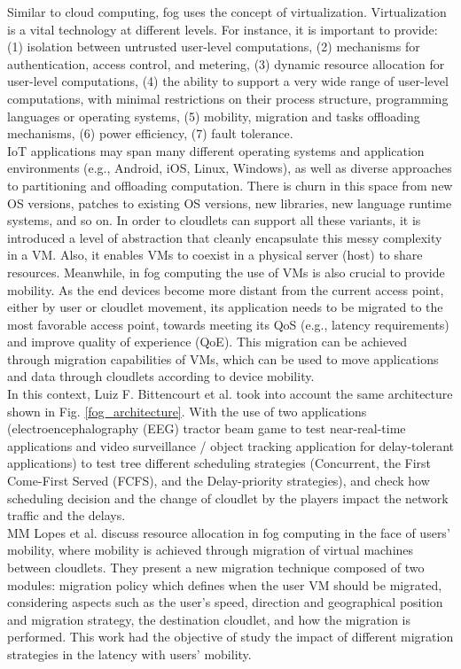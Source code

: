 Similar to cloud computing, fog uses the concept of virtualization. Virtualization is a vital technology at different levels. For instance, it is important to provide: (1) isolation between untrusted user-level computations, (2) mechanisms for authentication, access control, and metering, (3) dynamic resource allocation for user-level computations, (4) the ability to support a very wide range of user-level computations, with minimal restrictions on their process structure, programming languages or operating systems, (5) mobility, migration and tasks offloading mechanisms, (6) power efficiency, (7) fault tolerance.\\
\noindent\tab IoT applications may span many different operating systems and application environments (e.g., Android, iOS, Linux, Windows), as well as diverse approaches to partitioning and offloading computation. There is churn in this space from new OS versions, patches to existing OS versions, new libraries, new language runtime systems, and so on. In order to cloudlets can support all these variants, it is introduced a level of abstraction that cleanly encapsulate this messy complexity in a VM. Also, it enables VMs to coexist in a physical server (host) to share resources. Meanwhile, in fog computing the use of VMs is also crucial to provide mobility. As the end devices become more distant from the current access point, either by user or cloudlet movement, its application needs to be migrated to the most favorable access point, towards meeting its QoS (e.g., latency requirements) and improve quality of experience (QoE). This migration can be achieved through migration capabilities of VMs, which can be used to move applications and data through cloudlets according to device mobility.\\

In this context, Luiz F. Bittencourt et al. \cite{bittencourt2017mobility} took into account the same architecture shown in Fig. \ref{fog_architecture}. With the use of two applications (electroencephalography (EEG) tractor beam game to test near-real-time applications and video surveillance / object tracking application for delay-tolerant applications) to test tree different scheduling strategies (Concurrent, the First Come-First Served (FCFS), and the Delay-priority strategies), and check how scheduling decision and the change of cloudlet by the players impact the network traffic and the delays.\\

MM Lopes et al. \cite{Lopes2017} discuss resource allocation in fog computing in the face of users’ mobility, where mobility is achieved through migration of virtual machines between cloudlets. They present a new migration technique composed of two modules: migration policy which defines when the user VM should be migrated, considering aspects such as the user's speed, direction and geographical position and migration strategy, the destination cloudlet, and how the migration is performed. This work had the objective of study the impact of different migration strategies in the latency with users’ mobility.\\

